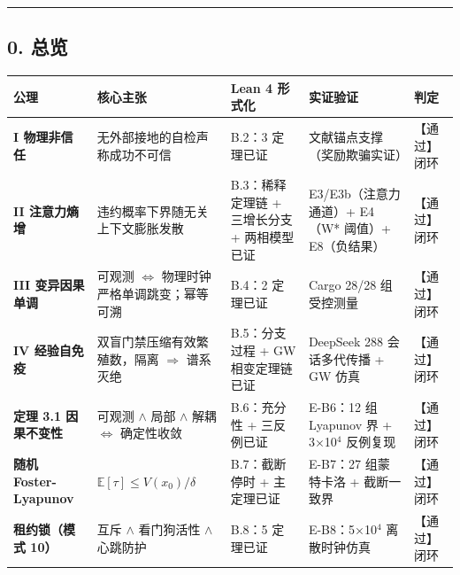 \begin{center}\rule{0.5\linewidth}{0.5pt}\end{center}

\subsection{0. 总览}\label{ux603bux89c8}

{\def\LTcaptype{} %
\begin{longtable}[]{@{}
  >{\raggedright\arraybackslash}p{}
  >{\raggedright\arraybackslash}p{}
  >{\raggedright\arraybackslash}p{}
  >{\raggedright\arraybackslash}p{}
  >{\raggedright\arraybackslash}p{}@{}}
\toprule\noalign{}
\begin{minipage}[b]{\linewidth}\raggedright
公理
\end{minipage} & \begin{minipage}[b]{\linewidth}\raggedright
核心主张
\end{minipage} & \begin{minipage}[b]{\linewidth}\raggedright
Lean 4 形式化
\end{minipage} & \begin{minipage}[b]{\linewidth}\raggedright
实证验证
\end{minipage} & \begin{minipage}[b]{\linewidth}\raggedright
判定
\end{minipage} \\
\midrule\noalign{}
\endhead
\bottomrule\noalign{}
\endlastfoot
\textbf{I 物理非信任} & 无外部接地的自检声称成功不可信 & B.2：3 定理已证
& 文献锚点支撑（奖励欺骗实证） & 【通过】 闭环 \\
\textbf{II 注意力熵增} & 违约概率下界随无关上下文膨胀发散 &
B.3：稀释定理链 + 三增长分支 + 两相模型已证 & E3/E3b（注意力通道）+
E4（W* 阈值）+ E8（负结果） & 【通过】 闭环 \\
\textbf{III 变异因果单调} & 可观测 \(\Leftrightarrow\)
物理时钟严格单调跳变；幂等可溯 & B.4：2 定理已证 & Cargo 28/28
组受控测量 & 【通过】 闭环 \\
\textbf{IV 经验自免疫} & 双盲门禁压缩有效繁殖数，隔离 \(\Rightarrow\)
谱系灭绝 & B.5：分支过程 + GW 相变定理链已证 & DeepSeek 288 会话多代传播
+ GW 仿真 & 【通过】 闭环 \\
\textbf{定理 3.1 因果不变性} & 可观测 \(\wedge\) 局部 \(\wedge\) 解耦
\(\Leftrightarrow\) 确定性收敛 & B.6：充分性 + 三反例已证 & E-B6：12 组
Lyapunov 界 + 3×10\(^{4}\) 反例复现 & 【通过】 闭环 \\
\textbf{随机 Foster-Lyapunov} & \(\mathbb{E}[\tau] \le V(x_0)/\delta\) &
B.7：截断停时 + 主定理已证 & E-B7：27 组蒙特卡洛 + 截断一致界 & 【通过】
闭环 \\
\textbf{租约锁（模式 10）} & 互斥 \(\wedge\) 看门狗活性 \(\wedge\)
心跳防护 & B.8：5 定理已证 & E-B8：5×10\(^{4}\) 离散时钟仿真 & 【通过】
闭环 \\
\end{longtable}
}

